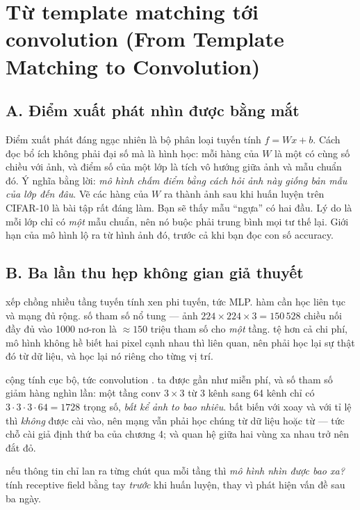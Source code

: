 \documentclass[../../deep_learning.tex]{subfiles}
\begin{document}
\section{Từ template matching tới convolution (From Template Matching to Convolution)}

\subsection{A. Điểm xuất phát nhìn được bằng mắt}

Điểm xuất phát đáng ngạc nhiên là bộ phân loại tuyến tính \(f = Wx + b\). Cách đọc bổ ích không phải đại số mà là hình học: mỗi hàng của \(W\) là một  có cùng số chiều với ảnh, và điểm số của một lớp là tích vô hướng giữa ảnh và mẫu chuẩn đó. Ý nghĩa bằng lời: \emph{mô hình chấm điểm bằng cách hỏi ảnh này giống bản mẫu của lớp đến đâu}. Vẽ các hàng của \(W\) ra thành ảnh sau khi huấn luyện trên CIFAR-10 là bài tập rất đáng làm. Bạn sẽ thấy mẫu ``ngựa'' có hai đầu. Lý do là mỗi lớp chỉ có \emph{một} mẫu chuẩn, nên nó buộc phải trung bình mọi tư thế lại. Giới hạn của mô hình lộ ra từ hình ảnh đó, trước cả khi bạn đọc con số accuracy.

\subsection{B. Ba lần thu hẹp không gian giả thuyết}

\begin{mach}
\item {} \gp xếp chồng nhiều tầng tuyến tính xen phi tuyến, tức MLP. \gd hàm cần học liên tục và mạng đủ rộng. \gia số tham số nổ tung --- ảnh \(224\times224\times3 = 150\,528\) chiều nối đầy đủ vào 1000 nơ-ron là \(\approx 150\) triệu tham số cho \emph{một} tầng. \vdm tệ hơn cả chi phí, mô hình không hề biết hai pixel cạnh nhau thì liên quan, nên phải học lại sự thật đó từ dữ liệu, và học lại nó riêng cho từng vị trí.
\item {} \gp {} cộng tính cục bộ, tức convolution \cite{lecun1998gradient}. \hq ta được  gần như miễn phí, và số tham số giảm hàng nghìn lần: một tầng conv \(3\times3\) từ 3 kênh sang 64 kênh chỉ có \(3\cdot3\cdot3\cdot64 = 1728\) trọng số, \emph{bất kể ảnh to bao nhiêu}. \gia bất biến với xoay và với tỉ lệ thì \emph{không} được cài vào, nên mạng vẫn phải học chúng từ dữ liệu hoặc từ  --- tức chỗ cài giả định thứ ba của chương 4; và quan hệ giữa hai vùng xa nhau trở nên đắt đỏ.
\item \vdm nếu thông tin chỉ lan ra từng chút qua mỗi tầng thì \emph{mô hình nhìn được bao xa?} \gp tính receptive field bằng tay \emph{trước} khi huấn luyện, thay vì phát hiện vấn đề sau ba ngày.
\end{mach}
\end{document}
